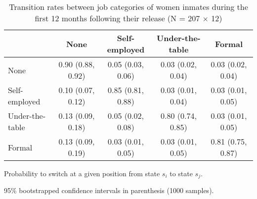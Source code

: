 \begin{table}[htp]
\scriptsize
\setlength{\tabcolsep}{10pt}
\renewcommand{\arraystretch}{1.3}
\begin{threeparttable}
\centering
\caption{Transition rates between job categories of women inmates \newline
    during the first 12 months following their release (N = 207 $\times$ 12)} 
\label{tab:transition_rates_job}
\begin{tabular}{lcccc}
  \hline
 & None & Self-employed & Under-the-table & Formal \\ 
  \hline
None & 0.90 (0.88, 0.92) & 0.05 (0.03, 0.06) & 0.03 (0.02, 0.04) & 0.03 (0.02, 0.04) \\ 
  Self-employed & 0.10 (0.07, 0.12) & 0.85 (0.81, 0.88) & 0.03 (0.01, 0.04) & 0.03 (0.01, 0.05) \\ 
  Under-the-table & 0.13 (0.09, 0.18) & 0.05 (0.02, 0.08) & 0.80 (0.74, 0.85) & 0.03 (0.01, 0.05) \\ 
  Formal & 0.13 (0.09, 0.19) & 0.03 (0.01, 0.05) & 0.03 (0.01, 0.05) & 0.81 (0.75, 0.87) \\ 
   \hline
\end{tabular}
\begin{tablenotes}
\scriptsize
\item Probability to switch at a given position from state $s_i$ to state $s_j$. 
    \item 95\% bootstrapped confidence intervals in parenthesis (1000 samples).
\end{tablenotes}
\end{threeparttable}
\end{table}
